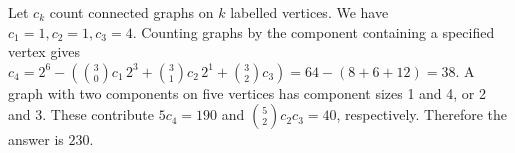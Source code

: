 Let $c_k$ count connected graphs on $k$ labelled vertices. We have $c_1=1,c_2=1,c_3=4$. Counting graphs by the component containing a specified vertex gives $c_4=2^6-\left(\binom30c_1\,2^3+\binom31c_2\,2^1+\binom32c_3\right)=64-(8+6+12)=38$. A graph with two components on five vertices has component sizes 1 and 4, or 2 and 3. These contribute $5c_4=190$ and $\binom52c_2c_3=40$, respectively. Therefore the answer is $\boxed{230}$.
